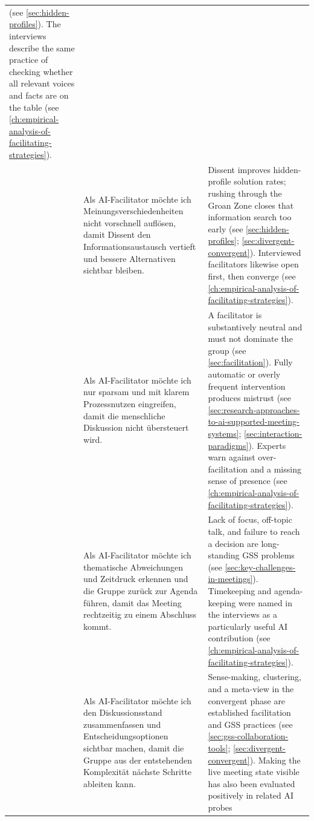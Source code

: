 \begin{xltabular}{\textwidth}{@{}
    >{\small\raggedright\arraybackslash}p{1.15cm}
    >{\small\raggedright\arraybackslash}X
    >{\small\raggedright\arraybackslash}X
  @{}}
  (see \autoref{sec:hidden-profiles}).
  The interviews describe the same practice of checking whether all relevant voices and facts are on
  the table
  (see \autoref{ch:empirical-analysis-of-facilitating-strategies}). \\
  \usblocksep
  & Als AI-Facilitator möchte ich Meinungsverschiedenheiten nicht vorschnell auflösen, damit Dissent
  den Informationsaustausch vertieft und bessere Alternativen sichtbar bleiben.
  & Dissent improves hidden-profile solution rates; rushing through the Groan Zone closes that
  information search too early
  (see \autoref{sec:hidden-profiles}; \autoref{sec:divergent-convergent}).
  Interviewed facilitators likewise open first, then converge
  (see \autoref{ch:empirical-analysis-of-facilitating-strategies}). \\
  \usblocksep
  & Als AI-Facilitator möchte ich nur sparsam und mit klarem Prozessnutzen eingreifen, damit die
  menschliche Diskussion nicht übersteuert wird.
  & A facilitator is substantively neutral and must not dominate the group
  (see \autoref{sec:facilitation}).
  Fully automatic or overly frequent intervention produces mistrust
  (see \autoref{sec:research-approaches-to-ai-supported-meeting-systems};
  \autoref{sec:interaction-paradigms}).
  Experts warn against over-facilitation and a missing sense of presence
  (see \autoref{ch:empirical-analysis-of-facilitating-strategies}). \\
  \usblocksep
  & Als AI-Facilitator möchte ich thematische Abweichungen und Zeitdruck erkennen und die Gruppe
  zurück zur Agenda führen, damit das Meeting rechtzeitig zu einem Abschluss kommt.
  & Lack of focus, off-topic talk, and failure to reach a decision are long-standing GSS problems
  (see \autoref{sec:key-challenges-in-meetings}).
  Timekeeping and agenda-keeping were named in the interviews as a particularly useful AI contribution
  (see \autoref{ch:empirical-analysis-of-facilitating-strategies}). \\
  \usblocksep
  & Als AI-Facilitator möchte ich den Diskussionsstand zusammenfassen und Entscheidungsoptionen
  sichtbar machen, damit die Gruppe aus der entstehenden Komplexität nächste Schritte ableiten kann.
  & Sense-making, clustering, and a meta-view in the convergent phase are established facilitation
  and GSS practices
  (see \autoref{sec:gss-collaboration-tools}; \autoref{sec:divergent-convergent}).
  Making the live meeting state visible has also been evaluated positively in related AI probes

\end{xltabular}
